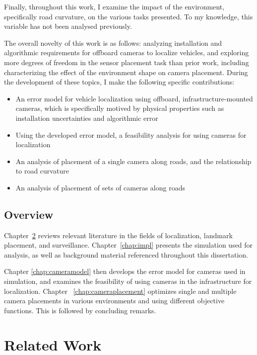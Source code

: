 \documentclass[a4paper,12pt,twoside,openright]{report}
\begin{document}
Finally, throughout this work, I examine the impact of the environment, specifically
road curvature, on the various tasks presented. To my knowledge, this variable has not been
analysed previously.

The overall novelty of this work is as follows: analyzing installation and algorithmic requirements
for offboard cameras to localize vehicles, and exploring more degrees of freedom in
the sensor placement task than prior work, including characterizing the 
effect of the environment shape on camera placement. During the development of these topics,
I make the following specific contributions:
\begin{itemize}
    \item An error model for vehicle localization using offboard, infrastructure-mounted cameras, which is
    specifically motived by physical properties such as installation uncertainties and algorithmic error
    \item Using the developed error model, a feasibility analysis for using cameras for localization
    \item An analysis of placement of a single camera along roads, and the relationship to road curvature
    \item An analysis of placement of sets of cameras along roads
\end{itemize}



\section{Overview}

Chapter~\ref{chap:relatedwork} reviews relevant literature in the fields of
localization, landmark placement, and surveillance. Chapter~\ref{chap:impl} presents 
the simulation used for analysis, as well as background material referenced throughout 
this dissertation.

Chapter \ref{chap:cameramodel} then develops the error model for cameras
used in simulation, and examines the feasibility of using cameras in the infrastructure for localization.
Chapter ~\ref{chap:cameraplacement} optimizes single and multiple camera placements
in various environments and using different objective functions. This is followed by concluding remarks.

\chapter{Related Work} 
\label{chap:relatedwork}
\end{document}
